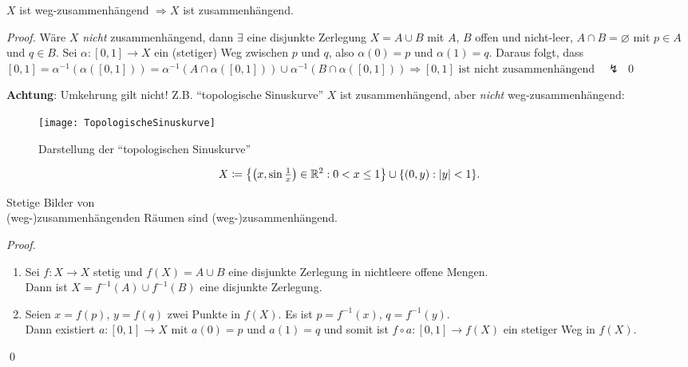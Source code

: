 \begin{lemma}
  \( X \) ist weg-zusammenhängend \( \Rightarrow X \) ist zusammenhängend.
  \begin{proof}
    Wäre \( X \) \emph{nicht} zusammenhängend, dann \( \exists \) eine disjunkte Zerlegung \( X = A \cup B \) mit \( A \), \( B \) offen und nicht-leer, \( A \cap B = \varnothing \) mit \( p \in A \) und \( q \in B \). Sei \( \alpha: [0,1] \to X \) ein (stetiger) Weg zwischen \( p \) und \( q \), also \( \alpha(0) = p \) und \( \alpha(1) = q \). Daraus folgt, dass \( [0,1] = \alpha^{-1}(\alpha([0,1])) = \alpha^{-1}(A \cap \alpha([0,1])) \cup \alpha^{-1}(B \cap \alpha([0,1])) \Rightarrow [0,1] \text{ ist nicht zusammenhängend} \quad \lightning \) \qed{}
  \end{proof}

  \begin{minipage}{.45\textwidth}
    \textbf{Achtung}: Umkehrung gilt nicht! Z.B. ``topologische Sinuskurve''\footnotemark{} \( X \) ist zusammenhängend, aber \emph{nicht} weg-zusammenhängend:
  \end{minipage}
  \hfill
  \begin{minipage}{.45\textwidth}
    \begin{figure}[H]
      \texttt{[image: TopologischeSinuskurve]}
      \caption{Darstellung der ``topologischen Sinuskurve''}
    \end{figure}
  \end{minipage}
  \begin{equation*}
    X \coloneqq \left \{ \left( x, \sin\tfrac{1}{x} \right) \in \mathbb{R}^2 : 0 < x \leq 1 \right \} \cup \{ (0,y) : \vert y \vert < 1 \}\text{.}
  \end{equation*}
\end{lemma}

\begin{lemma}
  Stetige Bilder von \\ (weg-)zusammenhängenden Räumen sind (weg-)zusammenhängend.
  \begin{proof}
    \
    \begin{enumerate}
      \item Sei \( f: X \to X \) stetig und \( f(X) = A \cup B \) eine disjunkte Zerlegung in nichtleere offene Mengen. \\
        Dann ist \( X = f^{-1}(A) \cup f^{-1}(B) \) eine disjunkte Zerlegung.
      \item Seien \( x = f(p) \), \( y = f(q) \) zwei Punkte in \( f(X) \). Es ist \( p = f^{-1}(x) \), \( q = f^{-1}(y) \). \\
        Dann existiert \( a: [0,1] \to X \) mit \( a(0) = p \) und \( a(1) = q \) und somit ist \( f \circ a: [0,1] \to f(X) \) ein stetiger Weg in \( f(X) \). 
    \end{enumerate}
    \qed{}
  \end{proof}
\end{lemma}

